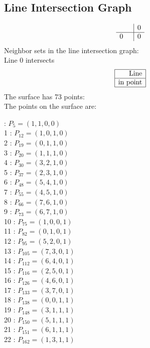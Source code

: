 \documentclass{article}
\begin{document}
{\subsection*{Line Intersection Graph}
{\arraycolsep=1pt
$$
\begin{array}{rr|*{1}r}
 &  & 0\\
\hline
0 &  & 0\\
\end{array}
$$
}%
Neighbor sets in the line intersection graph:\\
Line 0 intersects 
$$
\begin{array}{|r*{0}{|c}|}
\hline
\mbox{Line} \\
\hline
\mbox{in point} \\
\hline
\end{array}
$$
The surface has 73 points:\\
The points on the surface are:\\
\begin{multicols}{3}
 : $P_{5}=( 1, 1, 0, 0 )$\\
1 : $P_{12}=( 1, 0, 1, 0 )$\\
2 : $P_{19}=( 0, 1, 1, 0 )$\\
3 : $P_{20}=( 1, 1, 1, 0 )$\\
4 : $P_{30}=( 3, 2, 1, 0 )$\\
5 : $P_{37}=( 2, 3, 1, 0 )$\\
6 : $P_{48}=( 5, 4, 1, 0 )$\\
7 : $P_{55}=( 4, 5, 1, 0 )$\\
8 : $P_{66}=( 7, 6, 1, 0 )$\\
9 : $P_{73}=( 6, 7, 1, 0 )$\\
10 : $P_{75}=( 1, 0, 0, 1 )$\\
11 : $P_{82}=( 0, 1, 0, 1 )$\\
12 : $P_{95}=( 5, 2, 0, 1 )$\\
13 : $P_{105}=( 7, 3, 0, 1 )$\\
14 : $P_{112}=( 6, 4, 0, 1 )$\\
15 : $P_{116}=( 2, 5, 0, 1 )$\\
16 : $P_{126}=( 4, 6, 0, 1 )$\\
17 : $P_{133}=( 3, 7, 0, 1 )$\\
18 : $P_{138}=( 0, 0, 1, 1 )$\\
19 : $P_{148}=( 3, 1, 1, 1 )$\\
20 : $P_{150}=( 5, 1, 1, 1 )$\\
21 : $P_{151}=( 6, 1, 1, 1 )$\\
22 : $P_{162}=( 1, 3, 1, 1 )$\\

\end{multicols}}
\end{document}
